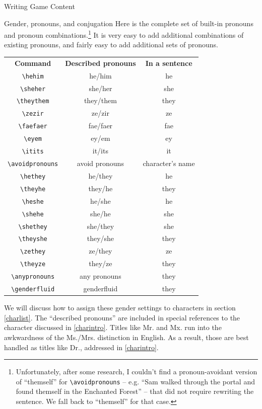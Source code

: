 \documentclass[sheet]{GameTexBase}
\begin{document}
\begin{section}{Writing Game Content}
\begin{subsection}{Gender, pronouns, and conjugation}
Here is the complete set of built-in pronouns and pronoun combinations.\footnote{Unfortunately, after some research, I couldn't find a pronoun-avoidant version of ``themself'' for \texttt{\textbackslash{}avoidpronouns} -- e.g. ``Sam walked through the portal and found themself in the Enchanted Forest'' -- that did not require rewriting the sentence.  We fall back to ``themself'' for that case.}   It is very easy to add additional combinations of existing pronouns, and fairly easy to add additional sets of pronouns.

\begin{center}
\begin{tabular}{c|c|c}
\textbf{Command} & \textbf{Described pronouns} & \textbf{In a sentence} \\
\lstinline|\hehim| & he/him & he \\
\lstinline|\sheher| & she/her & she \\
\lstinline|\theythem| & they/them & they \\
\lstinline|\zezir| & ze/zir & ze \\
\lstinline|\faefaer| & fae/faer & fae \\
\lstinline|\eyem| & ey/em & ey \\
\lstinline|\itits| & it/its & it \\
\lstinline|\avoidpronouns| & avoid pronouns & character's name\\
\lstinline|\hethey| & he/they & he \\
\lstinline|\theyhe| & they/he & they \\
\lstinline|\heshe| & he/she & he \\
\lstinline|\shehe| & she/he & she \\
\lstinline|\shethey| & she/they & she \\
\lstinline|\theyshe| & they/she & they \\
\lstinline|\zethey| & ze/they & ze \\
\lstinline|\theyze| & they/ze & they \\
\lstinline|\anypronouns| & any pronouns & they \\
\lstinline|\genderfluid| & genderfluid & they
\end{tabular}
\end{center}

We will discuss how to assign these gender settings to characters in section \ref{charlist}.  The ``described pronouns'' are included in special references to the character discussed in \ref{charintro}.
Titles like Mr. and Mx. run into the awkwardness of the Ms./Mrs. distinction in English.  As a result, those are best handled as titles like Dr., addressed in \ref{charintro}.


\end{subsection}
\end{section}
\end{document}
